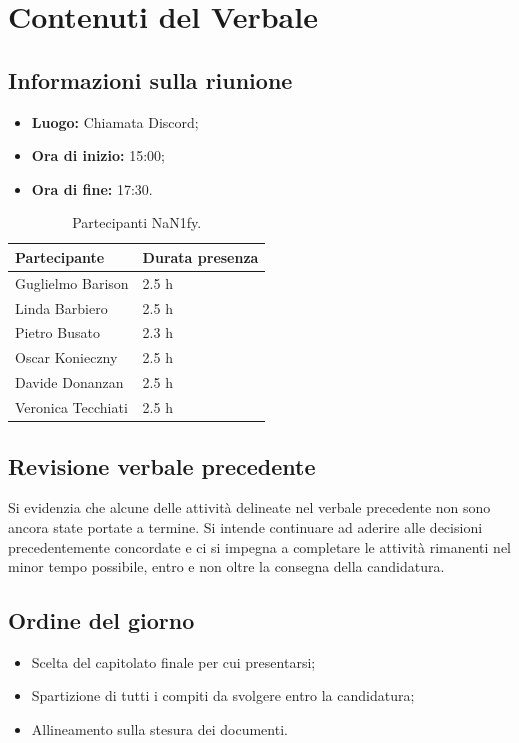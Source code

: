 \documentclass[8pt]{article}
\begin{document}
\section{Contenuti del Verbale}
\subsection{Informazioni sulla riunione}
\begin{itemize}
	\setlength\itemsep{0em}
	\item\textbf{Luogo:} Chiamata Discord;
	\item\textbf{Ora di inizio:} 15:00;
	\item\textbf{Ora di fine:}  17:30.
\end{itemize}
\begin{table}[ht!]
	\begin{minipage}[t]{0.5\linewidth}
		\centering
		\begin{tabular}{p{3cm} p{3cm}}
			\toprule
			\textbf{Partecipante} & \textbf{Durata presenza} \\
			\midrule
			Guglielmo Barison & 2.5 h \\
			Linda Barbiero &  2.5 h \\
			Pietro Busato & 2.3 h \\
			Oscar Konieczny & 2.5 h \\
			Davide Donanzan & 2.5 h \\
			Veronica Tecchiati & 2.5 h \\
			\bottomrule
		\end{tabular}
		\caption{Partecipanti NaN1fy.}
		\label{table:Partecipanti NaN1fy}
	\end{minipage}
\end{table}
\subsection{Revisione verbale precedente}
Si evidenzia che alcune delle attività delineate nel verbale precedente non sono ancora state portate a termine.
Si intende continuare ad aderire alle decisioni precedentemente concordate e ci si impegna a completare le attività rimanenti nel minor tempo possibile, entro e non oltre la consegna della candidatura.
\subsection{Ordine del giorno}
\begin{itemize}
	\setlength\itemsep{0em}
	\item Scelta del capitolato finale per cui presentarsi;
	\item Spartizione di tutti i compiti da svolgere entro la candidatura;
	\item Allineamento sulla stesura dei documenti.
\end{itemize}
\end{document}
